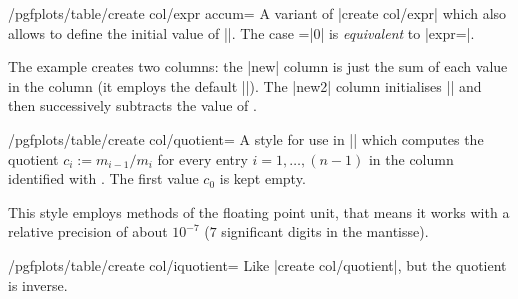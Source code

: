\begin{stylekey}{/pgfplots/table/create col/expr accum=}
	A variant of |create col/expr| which also allows to define the initial value of |\pgfmathaccuma|. The case =|0| is \emph{equivalent} to |expr=|.

\begin{codeexample}[]

\end{codeexample}
The example creates two columns: the |new| column is just the sum of each value in the  column (it employs the default ||). The |new2| column initialises || and then successively subtracts the value of .
\end{stylekey}

\begin{stylekey}{/pgfplots/table/create col/quotient=}
	A style for use in |\pgfplotstablecreatecol| which computes the quotient $c_i := m_{i-1} / m_i$ for every entry $i = 1,\dotsc, (n-1)$ in the column identified with . The first value $c_0$ is kept empty.

\begin{codeexample}[]

\end{codeexample}
	This style employs methods of the floating point unit, that means it works with a relative precision of about $10^{-7}$ ($7$ significant digits in the mantisse).
\end{stylekey}

\begin{stylekey}{/pgfplots/table/create col/iquotient=}
	Like |create col/quotient|, but the quotient is inverse.
\end{stylekey}

